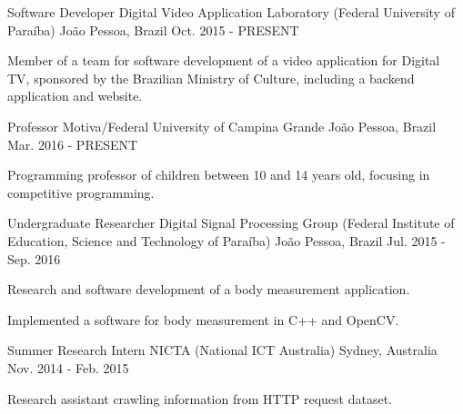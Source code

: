 

\begin{cventries}

  \cventry
    {Software Developer} %
    {Digital Video Application Laboratory (Federal University of Paraíba)} %
    {João Pessoa, Brazil} %
    {Oct. 2015 - PRESENT} %
    {
      \begin{cvitems} %
        \item {Member of a team for software development of a video application for Digital TV, sponsored by the Brazilian Ministry of Culture, including a backend application and website.}
      \end{cvitems}
    }
  \cventry
    {Professor} %
    {Motiva/Federal University of Campina Grande} %
    {João Pessoa, Brazil} %
    {Mar. 2016 - PRESENT} %
    {
      \begin{cvitems} %
        \item {Programming professor of children between 10 and 14 years old, focusing in competitive programming.}
      \end{cvitems}
    }
  \cventry
    {Undergraduate Researcher} %
    {Digital Signal Processing Group (Federal Institute of Education, Science and Technology of Paraíba)} %
    {João Pessoa, Brazil} %
    {Jul. 2015 - Sep. 2016} %
    {
      \begin{cvitems} %
	    \item {Research and software development of a body measurement application.}
        \item {Implemented a software for body measurement in C++ and OpenCV.}
      \end{cvitems}
    }

  \cventry
    {Summer Research Intern} %
    {NICTA (National ICT Australia)} %
    {Sydney, Australia} %
    {Nov. 2014 - Feb. 2015} %
    {
      \begin{cvitems} %
        \item {Research assistant crawling information from HTTP request dataset.}
      \end{cvitems}
    }


\end{cventries}
